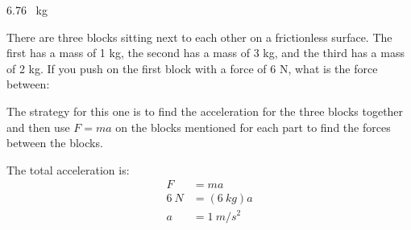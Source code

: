 \documentclass[fleqn,addpoints]{exam}
\begin{document}
\begin{questions}
\begin{parts}
\begin{solution}
  6.76 \ kg
\end{solution}

\end{parts}

\question There are three blocks sitting next to each other on a frictionless
surface.  The first has a mass of 1 kg, the second has a mass of 3 kg, and the
third has a mass of 2 kg.  If you push on the first block with a force of 6 N,
what is the force between:

\begin{solution}
The strategy for this one is to find the acceleration for the three blocks together and then use $F=ma$ on the blocks
mentioned for each part to find the forces between the blocks.

The total acceleration is:
\begin{align*}
  F &= ma \\
  6 \ N &= (6 \ kg) a \\
  a &= 1 \ m/s^2 \\
\end{align*}
\end{solution}

\end{questions}
\end{document}
